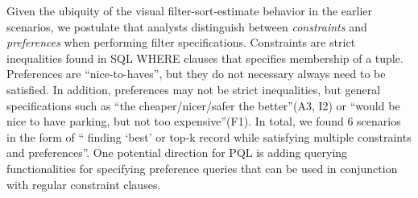 \documentclass{sig-alternate-05-2015}
\begin{document}
  \par Given the ubiquity of the visual filter-sort-estimate behavior in the earlier scenarios, we postulate that analysts distinguish between \textit{constraints} and \textit{preferences} when performing filter specifications. Constraints are strict inequalities found in SQL WHERE clauses that specifies membership of a tuple. Preferences are ``nice-to-haves'', but they do not necessary always need to be satisfied. In addition, preferences may not be strict inequalities, but general specifications such as ``the cheaper/nicer/safer the better''(A3, I2) or ``would be nice to have parking, but not too expensive''(F1). In total, we found 6 scenarios in the form of `` finding `best' or top-k record while satisfying multiple constraints and preferences''. One potential direction for PQL is adding querying functionalities for specifying preference queries that can be used in conjunction with regular constraint clauses. 
\end{document}
